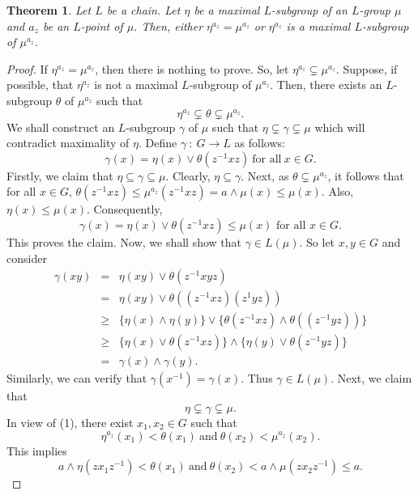 \documentclass[10pt]{article}
\theoremstyle{plain}
\newtheorem{theorem}{Theorem}[section]
\theoremstyle{definition}
\theoremstyle{remark}
\theoremstyle{case}
\begin{document}
\begin{theorem}
Let $L$ be a chain. Let $\eta$ be a maximal $L$-subgroup of an $L$-group $\mu$ and $a_z$ be an $L$-point of $\mu$. Then, either $\eta^{a_z}=\mu^{a_z}$ or $\eta^{a_z}$ is a maximal $L$-subgroup of $\mu^{a_z}$. 
\end{theorem}
\begin{proof}
If $\eta^{a_z}=\mu^{a_z}$, then there is nothing to prove. So, let $\eta^{a_z} \subsetneq \mu^{a_z}$. Suppose, if possible, that $\eta^{a_z}$ is not a maximal $L$-subgroup of $\mu^{a_z}$. Then, there exists an $L$-subgroup $\theta$ of $\mu^{a_z}$ such that 
\begin{equation}
\eta^{a_z}\subsetneq \theta \subsetneq \mu^{a_z}.
\end{equation}
\noindent We shall construct an $L$-subgroup $\gamma$ of $\mu$ such that $\eta \subsetneq \gamma \subsetneq \mu$ which will contradict maximality of $\eta$. Define $\gamma ~: ~G \to L$  as follows:
\[ \gamma(x)= \eta(x)\vee \theta(z^{-1}xz)~\text{for all}~ x\in G.\]
 Firstly, we claim that $\eta\subseteq \gamma \subseteq \mu$. Clearly, $\eta \subseteq \gamma$. Next,  as $\theta \subsetneq \mu^{a_z}$, it follows that for all $x \in G$, $\theta (z^{-1}xz)\leq \mu^{a_z}(z^{-1}xz) = a \wedge \mu(x) \leq \mu(x)$. Also,  $\eta(x)\leq\mu(x)$. Consequently,
 \[
 \gamma(x)=\eta(x)\vee \theta (z^{-1}xz)\leq \mu(x) \text{ for all } x \in G.
 \]
 This proves the claim. Now, we shall show that $\gamma \in L(\mu)$. So let $x, y \in G$ and consider
\begin{eqnarray*}
	\gamma(xy)&=&\eta(xy)\vee \theta(z^{-1}xyz)\\
	&=& \eta(xy)\vee \theta((z^{-1}xz)(z^{1}yz))\\
	&\geq& \{\eta(x) \wedge \eta(y)\}\vee \{\theta(z^{-1}xz)\wedge\theta((z^{-1}yz))\}\\
	&\geq& \{\eta(x)\vee \theta(z^{-1}xz)\}\wedge\{\eta(y)\vee \theta(z^{-1}yz)\}\\
	&=& \gamma(x)\wedge \gamma(y).
\end{eqnarray*}
Similarly, we can verify that $\gamma(x^{-1})=\gamma(x)$. Thus $\gamma \in L(\mu)$. Next, we claim that 
\[\eta \subsetneq \gamma \subsetneq \mu.\]
In view of  (1), there exist $x_1, x_2 \in G$ such that 
\[ \eta^{a_z} (x_1) < \theta (x_1)~\text{and}~\theta (x_2) < \mu^{a_z}(x_2). \]
This implies
\begin{equation}
a\wedge\eta (zx_1z^{-1}) < \theta (x_1)~\text{and}~\theta(x_2)< a \wedge \mu(zx_2z^{-1})\leq a.
\end{equation}

\end{proof}
\end{document}
